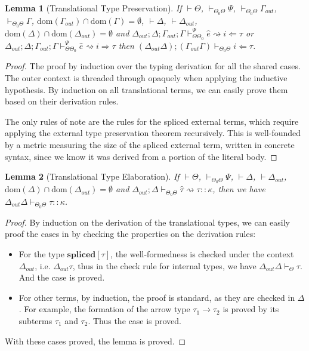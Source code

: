 \documentclass[letterpaper, notitlepage]{article}
\newtheorem{lemma}{Lemma}
\begin{document}
\begin{lemma}[Translational Type Preservation]
If $\vdash\Theta$, $\vdash_{\Theta_0\Theta} \Psi$, $\vdash_{\Theta_0\Theta}\Gamma_{out}$, $\vdash_{\Theta_0\Theta}\Gamma$, $\text{dom}(\Gamma_{out})\cap \text{dom}(\Gamma)=\emptyset$, $\vdash\Delta$, $\vdash\Delta_{out}$, $\text{dom}(\Delta)\cap\text{dom}(\Delta_{out})=\emptyset$ and $\Delta_{out};\Delta;\Gamma_{out};\Gamma\vdash_{\Theta\Theta_0}^{\Psi}\hat{e}\rightsquigarrow i\Leftarrow\tau$ or $\Delta_{out};\Delta;\Gamma_{out};\Gamma\vdash_{\Theta\Theta_0}^{\Psi}\hat{e}\rightsquigarrow i\Rightarrow \tau$ then $(\Delta_{out}\Delta);(\Gamma_{out}\Gamma)\vdash_{\Theta_0\Theta}i\Leftarrow \tau$.
\end{lemma}
\begin{proof}
The proof by induction over the typing derivation for all the shared cases. The outer context is threaded through opaquely when applying the inductive hypothesis. By induction on all translational terms, we can easily prove them based on their derivation rules.

The only rules of note are the rules for the spliced external terms, which require applying the external type preservation theorem recursively.
This is well-founded by a metric measuring the size of the spliced external term, written
in concrete syntax, since we know it was derived from a portion of the literal body.
\end{proof}

\begin{lemma}[Translational Type Elaboration]
If $\vdash\Theta$, $\vdash_{\Theta_0\Theta} \Psi$, $\vdash\Delta$, $\vdash\Delta_{out}$, $\text{dom}(\Delta)\cap\text{dom}(\Delta_{out})=\emptyset$ and $\Delta_{out};\Delta\vdash_{\Theta_0\Theta}\hat\tau\rightsquigarrow\tau::\kappa$, then we have $\Delta_{out}\Delta\vdash_{\Theta_0\Theta}\tau::\kappa$.
\end{lemma}
\begin{proof}
By induction on the derivation of the translational types, we can easily proof the cases in by checking the properties on the derivation rules:
\begin{itemize}
\item For the type $\mathbf{spliced}[\tau]$, the well-formedness is checked under the context $\Delta_{out}$, i.e. $\Delta_{out}\tau$, thus in the check rule for internal types, we have $\Delta_{out}\Delta\vdash_{\Theta}\tau$. And the case is proved.
\item For other terms, by induction, the proof is standard, as they are checked in $\Delta$. For example, the formation of the arrow type $\tau_1\rightarrow\tau_2$ is proved by its subterms $\tau_1$ and $\tau_2$. Thus the case is proved.
\end{itemize}
With these cases proved, the lemma is proved.
\end{proof}
\end{document}
